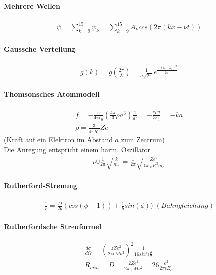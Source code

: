 \documentclass[10pt,a4paper]{article}
\begin{document}
\paragraph{Mehrere Wellen}$\,$ \\
\begin{align}
\psi = \sum_{k=9}^{15} \psi_k = \sum_{k=9}^{15} A_k cos(2\pi (kx- \nu t))
\end{align}
\paragraph{Gaussche Verteilung}$\,$ \\
\begin{align}
g(k)=g(\frac{2\pi}{\lambda})=\frac{1}{\sigma \sqrt{2\pi}} e^{\frac{-(k-k_0)^2}{2\sigma^2}}
\end{align}
\paragraph{Thomsonsches Atommodell}$\,$ \\
\begin{align}
f= -\frac{e}{4\pi \epsilon_0}(\frac{4\pi}{3} \rho a^3)\frac{1}{a^2} = -\frac{e\rho a}{3 \epsilon_0}=-ka \\
\rho = \frac{3}{4\pi R^3}Ze
\end{align}
(Kraft auf ein Elektron im Abstand $a$ zum Zentrum)\\
Die Anregung entspricht einem harm. Oszillator
\begin{align}
\nu 0 \frac{1}{2\pi} \sqrt{\frac{k}{m_e}}=\frac{1}{2\pi}\sqrt{\frac{Ze^2}{4\pi \epsilon_0 R^3 m_e}}
\end{align}
\paragraph{Rutherford-Streuung}$\,$\\
\begin{align}
\frac{1}{r}=\frac{D}{2b} (cos(\phi -1))+\frac{1}{b}sin(\phi))\; (Bahngleichung)
\end{align}
\paragraph{Rutherfordsche Streuformel}$\,$\\
\begin{align}
\frac{d\sigma}{d\Omega}= (\frac{zZe^2}{2\pi \epsilon M \nu^2})^2\frac{1}{16 sin^4(\frac{\theta}{2}}\\
R_{min} = D = \frac{2Ze^2}{2\pi \epsilon_0 M \nu^2} =26 \frac{e^2}{2\pi \epsilon E_\alpha}
\end{align}
\end{document}
